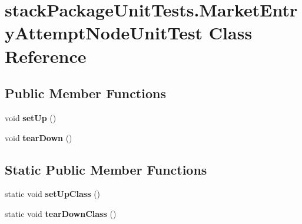 \hypertarget{classstack_package_unit_tests_1_1_market_entry_attempt_node_unit_test}{\section{stack\+Package\+Unit\+Tests.\+Market\+Entry\+Attempt\+Node\+Unit\+Test Class Reference}
\label{classstack_package_unit_tests_1_1_market_entry_attempt_node_unit_test}
}
\subsection*{Public Member Functions}
\begin{DoxyCompactItemize}
\item 
\hypertarget{classstack_package_unit_tests_1_1_market_entry_attempt_node_unit_test_a9390c1c0e025bf0b4e52d90e823b178e}{void {\bfseries set\+Up} ()}\label{classstack_package_unit_tests_1_1_market_entry_attempt_node_unit_test_a9390c1c0e025bf0b4e52d90e823b178e}

\item 
\hypertarget{classstack_package_unit_tests_1_1_market_entry_attempt_node_unit_test_ac53239c7d35e9cf1105772b0830bf111}{void {\bfseries tear\+Down} ()}\label{classstack_package_unit_tests_1_1_market_entry_attempt_node_unit_test_ac53239c7d35e9cf1105772b0830bf111}

\end{DoxyCompactItemize}
\subsection*{Static Public Member Functions}
\begin{DoxyCompactItemize}
\item 
\hypertarget{classstack_package_unit_tests_1_1_market_entry_attempt_node_unit_test_a4ca18c744d6e0e6ae6c71d18dc292e13}{static void {\bfseries set\+Up\+Class} ()}\label{classstack_package_unit_tests_1_1_market_entry_attempt_node_unit_test_a4ca18c744d6e0e6ae6c71d18dc292e13}

\item 
\hypertarget{classstack_package_unit_tests_1_1_market_entry_attempt_node_unit_test_af36feb95c6dbe4c59ce7f2014d7ba4ae}{static void {\bfseries tear\+Down\+Class} ()}\label{classstack_package_unit_tests_1_1_market_entry_attempt_node_unit_test_af36feb95c6dbe4c59ce7f2014d7ba4ae}

\end{DoxyCompactItemize}



